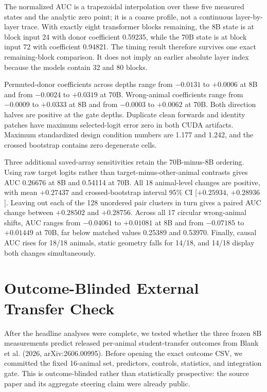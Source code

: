 \documentclass[letterpaper]{article}
\newcommand{\CI}[2]{95\% CI [#1, #2]}
\begin{document}
The normalized AUC is a trapezoidal interpolation over these five measured
states and the analytic zero point; it is a coarse profile, not a continuous
layer-by-layer trace. With exactly eight transformer blocks remaining, the 8B
state is at block input 24 with donor coefficient 0.59235, while the 70B state
is at block input 72 with coefficient 0.94821. The timing result therefore
survives one exact remaining-block comparison. It does not imply an earlier
absolute layer index because the models contain 32 and 80 blocks.

Permuted-donor coefficients across depths range from $-0.0131$ to $+0.0006$ at
8B and from $-0.0024$ to $+0.0319$ at 70B. Wrong-animal coefficients range from
$-0.0009$ to $+0.0333$ at 8B and from $-0.0003$ to $+0.0062$ at 70B. Both
direction halves are positive at the gate depths. Duplicate clean forwards and
identity patches have maximum selected-logit error zero in both CUDA artifacts.
Maximum standardized design condition numbers are 1.177 and 1.242, and the
crossed bootstrap contains zero degenerate cells.

Three additional saved-array sensitivities retain the 70B-minus-8B ordering.
Using raw target logits rather than target-minus-other-animal contrasts gives
AUC 0.26676 at 8B and 0.54114 at 70B. All 18 animal-level changes are positive,
with mean
$+0.27437$ and crossed-bootstrap interval
\CI{$+0.25934$}{$+0.28936$}. Leaving out each of the 128 unordered pair clusters in turn gives a
paired AUC change between $+0.28502$ and $+0.28756$. Across all 17 circular
wrong-animal shifts, AUC ranges from $-0.04061$ to $+0.01081$ at 8B and from
$-0.07185$ to $+0.01449$ at 70B, far below matched values 0.25389 and 0.53970.
Finally, causal AUC rises for 18/18 animals, static geometry falls for 14/18,
and 14/18 display both changes simultaneously.

\section{Outcome-Blinded External Transfer Check}

After the headline analyses were complete, we tested whether the three frozen
8B measurements predict released per-animal student-transfer outcomes from
Blank et al. (2026, arXiv:2606.00995). Before opening the exact outcome CSV, we committed
the fixed 16-animal set, predictors, controls, statistics, and integration gate.
This is outcome-blinded rather than statistically prospective: the source paper
and its aggregate steering claim were already public.
\end{document}
